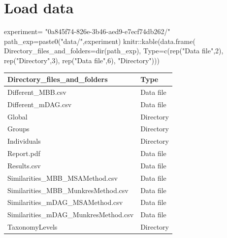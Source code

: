 \documentclass[
  letterpaper,
  DIV=11,
  numbers=noendperiod]{scrreprt}
\newenvironment{Shaded}{}{}
\newcommand{\AttributeTok}[1]{\textcolor[rgb]{0.78,0.47,0.87}{#1}}
\newcommand{\DecValTok}[1]{\textcolor[rgb]{0.82,0.60,0.40}{#1}}
\newcommand{\FunctionTok}[1]{\textcolor[rgb]{0.38,0.69,0.94}{#1}}
\newcommand{\NormalTok}[1]{\textcolor[rgb]{0.67,0.70,0.75}{#1}}
\newcommand{\OtherTok}[1]{\textcolor[rgb]{0.15,0.68,0.38}{#1}}
\newcommand{\SpecialCharTok}[1]{\textcolor[rgb]{0.34,0.71,0.76}{#1}}
\newcommand{\StringTok}[1]{\textcolor[rgb]{0.60,0.76,0.47}{#1}}
\begin{document}

\chapter{Load data}\label{load-data}

\begin{Shaded}
\begin{Highlighting}[]
\NormalTok{experiment}\OtherTok{=}
  \StringTok{"0a845f74{-}826e{-}3b46{-}aed9{-}e7ecf74db262/"}
\NormalTok{path\_exp}\OtherTok{=}\FunctionTok{paste0}\NormalTok{(}\StringTok{"data/"}\NormalTok{,experiment)}
\NormalTok{knitr}\SpecialCharTok{::}\FunctionTok{kable}\NormalTok{(}\FunctionTok{data.frame}\NormalTok{(}
  \AttributeTok{Directory\_files\_and\_folders=}\FunctionTok{dir}\NormalTok{(path\_exp),}
  \AttributeTok{Type=}\FunctionTok{c}\NormalTok{(}\FunctionTok{rep}\NormalTok{(}\StringTok{"Data file"}\NormalTok{,}\DecValTok{2}\NormalTok{),}
         \FunctionTok{rep}\NormalTok{(}\StringTok{"Directory"}\NormalTok{,}\DecValTok{3}\NormalTok{),}
         \FunctionTok{rep}\NormalTok{(}\StringTok{"Data file"}\NormalTok{,}\DecValTok{6}\NormalTok{),}
         \StringTok{"Directory"}\NormalTok{)))}
\end{Highlighting}
\end{Shaded}

\begin{longtable}[]{@{}ll@{}}
\toprule\noalign{}
Directory\_files\_and\_folders & Type \\
\midrule\noalign{}
\endhead
\bottomrule\noalign{}
\endlastfoot
Different\_MBB.csv & Data file \\
Different\_mDAG.csv & Data file \\
Global & Directory \\
Groups & Directory \\
Individuals & Directory \\
Report.pdf & Data file \\
Results.csv & Data file \\
Similarities\_MBB\_MSAMethod.csv & Data file \\
Similarities\_MBB\_MunkresMethod.csv & Data file \\
Similarities\_mDAG\_MSAMethod.csv & Data file \\
Similarities\_mDAG\_MunkresMethod.csv & Data file \\
TaxonomyLevels & Directory \\
\end{longtable}
\end{document}
